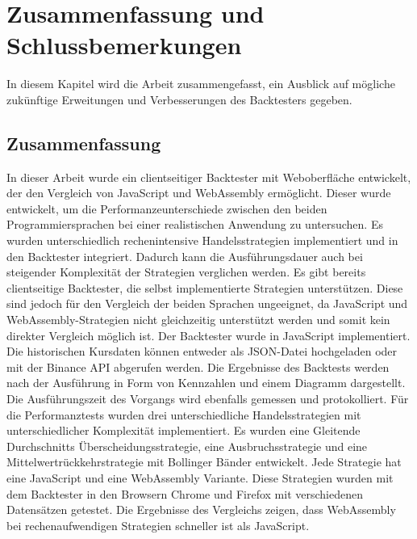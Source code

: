 \chapter{Zusammenfassung und Schlussbemerkungen}
\label{cha:ZusammenfassungundSchlussbemerkungen}

In diesem Kapitel wird die Arbeit zusammengefasst, ein Ausblick auf mögliche zukünftige Erweitungen und Verbesserungen des Backtesters gegeben.

\section{Zusammenfassung}
\label{sec:Zusammenfassung}

In dieser Arbeit wurde ein clientseitiger Backtester mit Weboberfläche entwickelt, der den Vergleich von JavaScript und WebAssembly ermöglicht.
Dieser wurde entwickelt, um die Performanzeunterschiede zwischen den beiden Programmiersprachen bei einer realistischen Anwendung zu untersuchen.
Es wurden unterschiedlich rechenintensive Handelsstrategien implementiert und in den Backtester integriert.
Dadurch kann die Ausführungsdauer auch bei steigender Komplexität der Strategien verglichen werden.
\newline
Es gibt bereits clientseitige Backtester, die selbst implementierte Strategien unterstützen.
Diese sind jedoch für den Vergleich der beiden Sprachen ungeeignet, da JavaScript und WebAssembly-Strategien nicht gleichzeitig unterstützt werden und somit kein direkter Vergleich möglich ist.
\newline
Der Backtester wurde in JavaScript implementiert.
Die historischen Kursdaten können entweder als JSON-Datei hochgeladen oder mit der Binance API abgerufen werden.
Die Ergebnisse des Backtests werden nach der Ausführung in Form von Kennzahlen und einem Diagramm dargestellt.
Die Ausführungszeit des Vorgangs wird ebenfalls gemessen und protokolliert.
\newline
Für die Performanztests wurden drei unterschiedliche Handelsstrategien mit unterschiedlicher Komplexität implementiert.
Es wurden eine Gleitende Durchschnitts Überscheidungsstrategie, eine Ausbruchsstrategie und eine Mittelwertrückkehrstrategie mit Bollinger Bänder entwickelt.
Jede Strategie hat eine JavaScript und eine WebAssembly Variante.
Diese Strategien wurden mit dem Backtester in den Browsern Chrome und Firefox mit verschiedenen Datensätzen getestet.
\newline
Die Ergebnisse des Vergleichs zeigen, dass WebAssembly bei rechenaufwendigen Strategien schneller ist als JavaScript.
